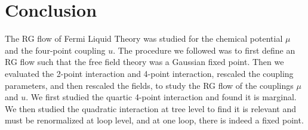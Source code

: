 \documentclass{article}
\begin{document}
\section{Conclusion}
The RG flow of Fermi Liquid Theory was studied for the chemical potential $\mu$ and the four-point coupling $u$. The procedure we followed was to first define an RG flow such that the free field theory was a Gaussian fixed point. Then we evaluated the 2-point interaction and 4-point interaction, rescaled the coupling parameters, and then rescaled the fields, to study the RG flow of the couplings $\mu$ and $u$. We first studied the quartic 4-point interaction and found it is marginal. We then studied the quadratic interaction at tree level to find it is relevant and must be renormalized at loop level, and at one loop, there is indeed a fixed point.
\end{document}
